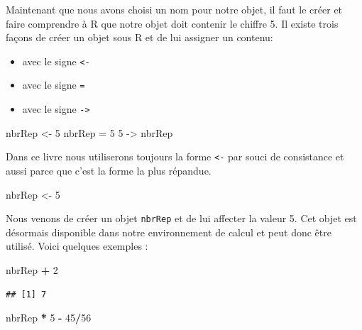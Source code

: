 \documentclass[
]{book}
\newenvironment{Shaded}{\begin{snugshade}}{\end{snugshade}}
\newcommand{\DecValTok}[1]{\textcolor[rgb]{0.00,0.00,0.81}{#1}}
\newcommand{\NormalTok}[1]{#1}
\newcommand{\OperatorTok}[1]{\textcolor[rgb]{0.81,0.36,0.00}{\textbf{#1}}}
\newcommand{\StringTok}[1]{\textcolor[rgb]{0.31,0.60,0.02}{#1}}
\providecommand{\tightlist}{%
  \setlength{\itemsep}{0pt}\setlength{\parskip}{0pt}}
\begin{document}
Maintenant que nous avons choisi un nom pour notre objet, il faut le créer et faire comprendre à R que notre objet doit contenir le chiffre 5. Il existe trois façons de créer un objet sous R et de lui assigner un contenu:

\begin{itemize}
\tightlist
\item
  avec le signe \texttt{\textless{}-}
\item
  avec le signe \texttt{=}
\item
  avec le signe \texttt{-\textgreater{}}
\end{itemize}

\begin{Shaded}
\begin{Highlighting}[]
\NormalTok{nbrRep <-}\StringTok{ }\DecValTok{5}
\NormalTok{nbrRep =}\StringTok{ }\DecValTok{5}
\DecValTok{5}\NormalTok{ ->}\StringTok{ }\NormalTok{nbrRep}
\end{Highlighting}
\end{Shaded}

Dans ce livre nous utiliserons toujours la forme \texttt{\textless{}-} par souci de consistance et aussi parce que c'est la forme la plus répandue.

\begin{Shaded}
\begin{Highlighting}[]
\NormalTok{nbrRep <-}\StringTok{ }\DecValTok{5}
\end{Highlighting}
\end{Shaded}

Nous venons de créer un objet \texttt{nbrRep} et de lui affecter la valeur 5. Cet objet est désormais disponible dans notre environnement de calcul et peut donc être utilisé. Voici quelques exemples :

\begin{Shaded}
\begin{Highlighting}[]
\NormalTok{nbrRep }\OperatorTok{+}\StringTok{ }\DecValTok{2}
\end{Highlighting}
\end{Shaded}

\begin{verbatim}
## [1] 7
\end{verbatim}

\begin{Shaded}
\begin{Highlighting}[]
\NormalTok{nbrRep }\OperatorTok{*}\StringTok{ }\DecValTok{5} \OperatorTok{-}\StringTok{ }\DecValTok{45}\OperatorTok{/}\DecValTok{56}
\end{Highlighting}
\end{Shaded}
\end{document}
